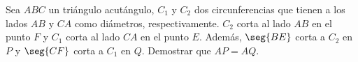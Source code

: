 Sea $ABC$ un triángulo acutángulo, $C_1$ y $C_2$ dos circunferencias que tienen a los lados $AB$ y $CA$ como diámetros, respectivamente. $C_2$ corta al lado $AB$ en el punto $F$ y $C_1$ corta al lado $CA$ en el punto $E$. Además, $\seg{BE}$ corta a $C_2$ en $P$ y $\seg{CF}$ corta a $C_1$ en $Q$. Demostrar que $AP=AQ$.
